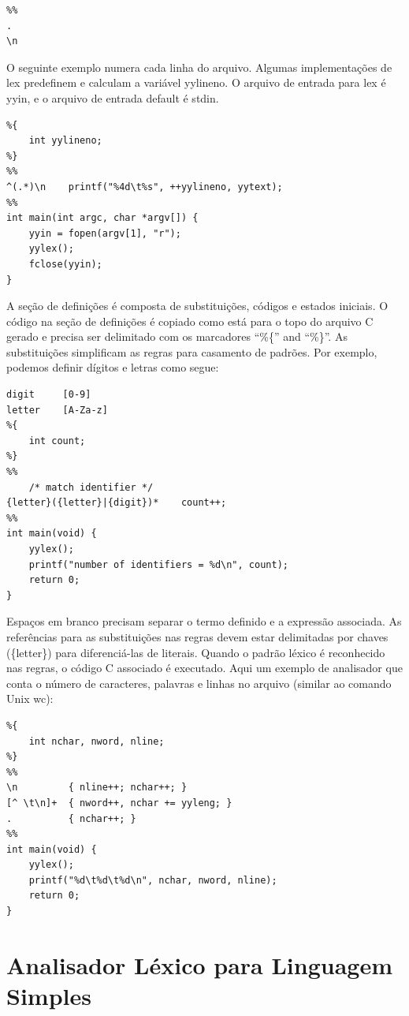 \documentclass[
  brazilian,
  letterpaper,
]{book}
\theoremstyle{plain}
\theoremstyle{definition}
\theoremstyle{remark}
\begin{document}
\begin{verbatim}
%%
.
\n
\end{verbatim}

O seguinte exemplo numera cada linha do arquivo. Algumas implementações
de lex predefinem e calculam a variável yylineno. O arquivo de entrada
para lex é yyin, e o arquivo de entrada default é stdin.

\begin{verbatim}
%{
    int yylineno;
%}
%%
^(.*)\n    printf("%4d\t%s", ++yylineno, yytext);
%%
int main(int argc, char *argv[]) {
    yyin = fopen(argv[1], "r");
    yylex();
    fclose(yyin);
}
\end{verbatim}

A seção de definições é composta de substituições, códigos e estados
iniciais. O código na seção de definições é copiado como está para o
topo do arquivo C gerado e precisa ser delimitado com os marcadores
``\%\{'' and ``\%\}''. As substituições simplificam as regras para
casamento de padrões. Por exemplo, podemos definir dígitos e letras como
segue:

\begin{verbatim}
digit     [0-9]
letter    [A-Za-z]
%{
    int count;
%}
%%
    /* match identifier */
{letter}({letter}|{digit})*    count++;
%%
int main(void) {
    yylex();
    printf("number of identifiers = %d\n", count);
    return 0;
}
\end{verbatim}

Espaços em branco precisam separar o termo definido e a expressão
associada. As referências para as substituições nas regras devem estar
delimitadas por chaves (\{letter\}) para diferenciá-las de literais.
Quando o padrão léxico é reconhecido nas regras, o código C associado é
executado. Aqui um exemplo de analisador que conta o número de
caracteres, palavras e linhas no arquivo (similar ao comando Unix wc):

\begin{verbatim}
%{
    int nchar, nword, nline;
%}
%%
\n         { nline++; nchar++; }
[^ \t\n]+  { nword++, nchar += yyleng; }
.          { nchar++; }
%%
int main(void) {
    yylex();
    printf("%d\t%d\t%d\n", nchar, nword, nline);
    return 0;
}
\end{verbatim}

\section{Analisador Léxico para Linguagem
Simples}\label{analisador-luxe9xico-para-linguagem-simples}
\end{document}
